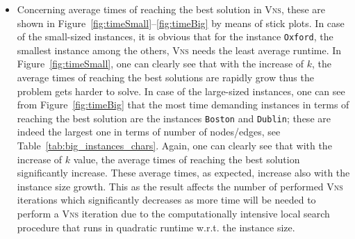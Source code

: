 \documentclass[dvipsnames,format=sigconf,anonymous=true,review=true]{acmart}
\begin{document}
\begin{itemize}
   		\item Concerning average times of reaching the best solution in \textsc{Vns}, these are shown in Figure~\ref{fig:timeSmall}--\ref{fig:timeBig} by means of stick plots.  In case of the small-sized instances, it is obvious that for the instance \texttt{Oxford},  the smallest instance among the others, \textsc{Vns} needs the least average runtime.  In Figure~\ref{fig:timeSmall}, one can clearly see that with the increase of $k$, the average times of reaching the best solutions are rapidly grow thus the problem gets harder to solve. In case of the large-sized instances, one can see  from  Figure~\ref{fig:timeBig} that the most time demanding instances in terms of reaching the best solution are the instances \texttt{Boston} and \texttt{Dublin}; these are indeed the largest one in terms of number of nodes/edges, see Table~\ref{tab:big_instances_chars}. Again, one can clearly see that with the increase of $k$ value, the average times of reaching the best solution significantly increase. These  average times, as expected, increase also with the instance size growth. This as the result affects the number of performed \textsc{Vns} iterations which significantly decreases as more time will be needed to perform a \textsc{Vns} iteration due to the   computationally intensive local search procedure that runs in quadratic runtime w.r.t. the instance size.
   \end{itemize}
 
 
\end{document}
